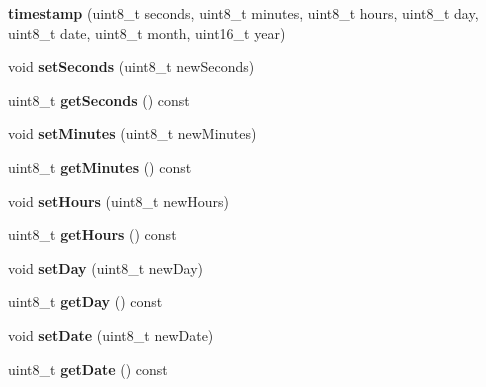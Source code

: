 \begin{DoxyCompactItemize}
\item 
\mbox{\label{classtimestamp_adcd43bf86d093792baa6b406e0acafd3}} 
{\bfseries timestamp} (uint8\+\_\+t seconds, uint8\+\_\+t minutes, uint8\+\_\+t hours, uint8\+\_\+t day, uint8\+\_\+t date, uint8\+\_\+t month, uint16\+\_\+t year)
\item 
\mbox{\label{classtimestamp_a7d2a5311e064fb9fe0ebbb74e603091c}} 
void {\bfseries set\+Seconds} (uint8\+\_\+t new\+Seconds)
\item 
\mbox{\label{classtimestamp_a9212a15c81b0f77b576257cba2805253}} 
uint8\+\_\+t {\bfseries get\+Seconds} () const
\item 
\mbox{\label{classtimestamp_a95383562b21c79d2d3279f4c06a8cc18}} 
void {\bfseries set\+Minutes} (uint8\+\_\+t new\+Minutes)
\item 
\mbox{\label{classtimestamp_a77adde4c8da3bfc1076882f2627938f7}} 
uint8\+\_\+t {\bfseries get\+Minutes} () const
\item 
\mbox{\label{classtimestamp_ae074684cb0c1f937c9ab985692522217}} 
void {\bfseries set\+Hours} (uint8\+\_\+t new\+Hours)
\item 
\mbox{\label{classtimestamp_a9857c77d68def8f77737f3c3840b6b95}} 
uint8\+\_\+t {\bfseries get\+Hours} () const
\item 
\mbox{\label{classtimestamp_af280dd8ed37274b31a548619f21dddd9}} 
void {\bfseries set\+Day} (uint8\+\_\+t new\+Day)
\item 
\mbox{\label{classtimestamp_a70baea53133ff4b05eb49332e3ef36bb}} 
uint8\+\_\+t {\bfseries get\+Day} () const
\item 
\mbox{\label{classtimestamp_a7392ce4abda5f63e95462bd99691b719}} 
void {\bfseries set\+Date} (uint8\+\_\+t new\+Date)
\item 
\mbox{\label{classtimestamp_a0ee0b3188b94fd8151f4525ea0de1078}} 
uint8\+\_\+t {\bfseries get\+Date} () const

\end{DoxyCompactItemize}
